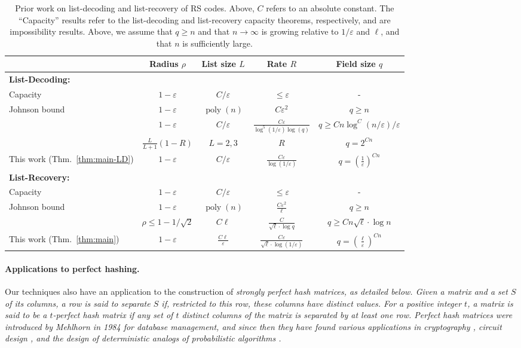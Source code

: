 \documentclass[11pt]{article}
\newcommand\black[1]{{\color{black} #1}}
\renewcommand{\epsilon}{\varepsilon}
\newcommand{\eps}{\epsilon}
\DeclareMathOperator{\poly}{poly}
\begin{document}
\renewcommand{\arraystretch}{1.4}
\begin{table}\caption{Prior work on list-decoding and list-recovery of RS codes.  Above, $C$ refers to an absolute constant.  The ``Capacity'' results refer to the list-decoding and list-recovery capacity theorems, respectively, and are impossibility results.  Above, we assume that $q \geq n$ and that $n \to \infty$ is growing relative to $1/\eps$ and $\ell$, and that $n$ is sufficiently large.}\label{tab:litreview}
\centering
\begin{tabular}{|p{3.8cm}||c|c|c|c|}
\hline
 & Radius $\rho$ & List size $L$ & Rate $R$ & Field size $q$ \\
\hline\hline
\textbf{List-Decoding:} &&&&\\
\hline
Capacity
& $1 - \eps$ & \black{$C/\eps$} & $\leq  \eps$ & - \\
\hline
Johnson bound & $1 - \eps$ & $\poly(n)$ & $C \eps^2$ & $q \geq n$ \\
\hline
\cite{Rudra-Wootters} & $1 - \eps$ & $C/\eps$ & $\frac{C\eps}{ \log^5(1/\eps) \log(q) }$ & $q \geq Cn\log^C(n/\eps)/\eps$ \\
\hline
\cite{shangguan2019combinatorial0} & $\frac{L}{L+1}(1-R)$ & $L=2,3$ & $R$ & $q = 2^{Cn}$ \\
\hline
This work (Thm.~\ref{thm:main-LD}) & $1 - \eps$ & $C/\eps$ & $\frac{C\eps}{ \log(1/\eps) }$ & $q = \left(\frac{1}{\eps}\right)^{Cn}$ \\
\hline
\hline
\textbf{List-Recovery:} &&&&\\
\hline
Capacity  & $1 - \eps$ & \black{$C/\eps$} & $\leq  \eps$ & -  \\
\hline
Johnson bound & $1 - \eps$ & $\poly(n)$ & $\frac{C\eps^2}{\ell}$ & $q \geq n$ \\
\hline
\cite{LP20} & $\rho \leq 1 - 1/\sqrt{2}$& $C\ell$ & $\frac{C}{\sqrt{\ell} \cdot \log q}$ & $q \geq C n \sqrt{\ell} \cdot \log n$ \\
\hline
This work (Thm.~\ref{thm:main}) & $1 - \eps$ & $\frac{C\ell}{\eps}$ & $\frac{C\eps}{\sqrt{\ell} \cdot \log(1/\eps)}$ & $q = \left(\frac{\ell}{\eps} \right)^{Cn}$ \\
\hline
\end{tabular}
\end{table}



\paragraph{Applications to perfect hashing.}
Our techniques also have an application to the construction of \em strongly perfect hash matrices\em, as detailed below.
Given a matrix and a set $S$ of its columns, a row is said to {\it separate} $S$ if, restricted to this row, these columns have distinct values. For a positive integer $t$, a matrix is said to be a {\it $t$-perfect hash matrix} if any set of $t$ distinct columns of the matrix is separated by at least one row.
Perfect hash matrices were introduced by Mehlhorn \cite{data1} in 1984 for database management, and since then they have found various applications in cryptography \cite{cyr1}, circuit design \cite{circuit}, and the design of deterministic analogs of probabilistic algorithms \cite{alog}.
\end{document}
